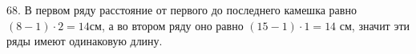 68. В первом ряду расстояние от первого до последнего камешка равно $(8-1)\cdot2=14$см, а во втором ряду оно равно $(15-1)\cdot1=14$ см, значит эти ряды имеют одинаковую длину.\\
